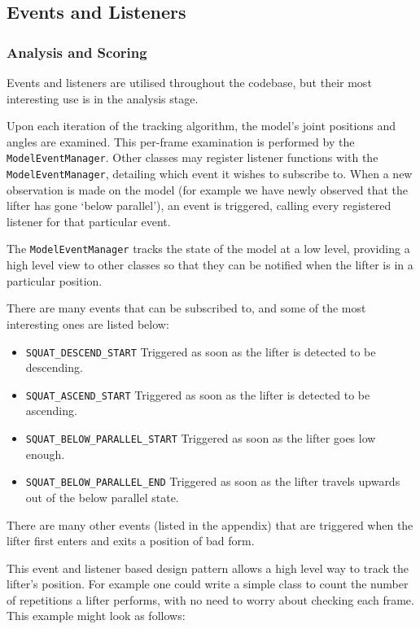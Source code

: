 \subsection{Events and Listeners}
\label{sec:listeners}

\subsubsection{Analysis and Scoring}

Events and listeners are utilised throughout the codebase, but their most interesting use is in the analysis stage.

Upon each iteration of the tracking algorithm, the model's joint positions and angles are examined. This per-frame examination is performed by the \texttt{ModelEventManager}. Other classes may register listener functions with the \texttt{ModelEventManager}, detailing which event it wishes to subscribe to. When a new observation is made on the model (for example we have newly observed that the lifter has gone `below parallel'), an event is triggered, calling every registered listener for that particular event.

The \texttt{ModelEventManager} tracks the state of the model at a low level, providing a high level view to other classes so that they can be notified when the lifter is in a particular position.

There are many events that can be subscribed to, and some of the most interesting ones are listed below:

\begin{itemize}
	\item \texttt{SQUAT\_DESCEND\_START} Triggered as soon as the lifter is detected to be descending.
	\item \texttt{SQUAT\_ASCEND\_START} Triggered as soon as the lifter is detected to be ascending.
	\item \texttt{SQUAT\_BELOW\_PARALLEL\_START} Triggered as soon as the lifter goes low enough.
	\item \texttt{SQUAT\_BELOW\_PARALLEL\_END} Triggered as soon as the lifter travels upwards out of the below parallel state.
\end{itemize}

There are many other events (listed in the appendix) that are triggered when the lifter first enters and exits a position of bad form.

This event and listener based design pattern allows a high level way to track the lifter's position. For example one could write a simple class to count the number of repetitions a lifter performs, with no need to worry about checking each frame. This example might look as follows:

